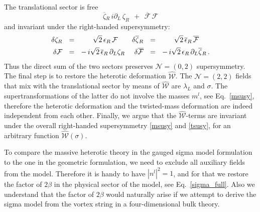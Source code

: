 \documentclass[12pt]{article}
\newcommand{\ntwot}{${\mathcal N}= \left(2,2\right) $ }
\newcommand{\ntwoo}{${\mathcal N}= \left(0,2\right) $ }
\newcommand{\p}{\partial}
\newcommand{\ov}{\overline}
\newcommand{\mc}[1]{\mathcal{#1}}
\newcommand{\bzr}{\ov{\zeta}{}_R}
\newcommand{\zr}{\zeta_R}
\newcommand{\blal}{\ov{\lambda}{}_L}
\newcommand{\ff}{\mc{F}}
\newcommand{\bff}{\ov{\mc{F}}}
\newcommand{\eer}{\epsilon_R}
\newcommand{\beer}{\ov{\epsilon}{}_R}
\begin{document}
	The translational sector is free
\[
	\bzr\, i\p_L\, \zr ~~+~~ \bff\,\ff
\]
	and invariant under the right-handed supersymmetry:
\begin{align}
%
\notag
        \delta \zr & ~~=~~ ~~~~~ \sqrt{2}\, \eer\, \ff
        &
        \delta \bzr & ~~=~~ ~~~~~ \sqrt{2}\, \beer\, \bff
        \\
%
\label{tsusy}
        \delta \ff & ~~=~~ -\, i\sqrt{2}\, \beer\, \p_L \zr
        &
        \delta \bff & ~~=~~ -\, i\sqrt{2}\, \eer\, \p_L \bzr
        \,.
\end{align}
	Thus the direct sum of the two sectors preserves \ntwoo supersymmetry.
	The final step is to restore the heterotic deformation $ \hat{\mc{W}} $. 
	The \ntwot fields that mix with the translational sector by means
	of $ \hat{\mc{W}} $ are $ \lambda_L $ and $ \sigma $.
	The supertransformations of the latter do not involve the masses $ m^l $, see Eq.~\eqref{msusy},
	therefore the heterotic deformation and the twisted-mass deformation are indeed independent
	from each other.
	Finally, we argue that the $ \hat{\mc{W}} $-terms are invariant under the overall
	right-handed supersymmetry \eqref{msusy} and \eqref{tsusy}, for an arbitrary function $ \hat{\mc{W}}(\sigma) $.

        To compare the massive heterotic theory in the gauged sigma model formulation to
        the one in the geometric formulation, we need to exclude all auxiliary fields from the model.
        Therefore it is handy to have $ | n^l |^2 = 1 $, and for that we restore the factor of 
        $ 2\beta $ in the physical sector of the model, see Eq.~\eqref{sigma_full}.
        Also we understand that the factor of $ 2\beta $ would naturally arise if we 
        attempt to derive the sigma model from the vortex string in a four-dimensional bulk theory.
\end{document}
